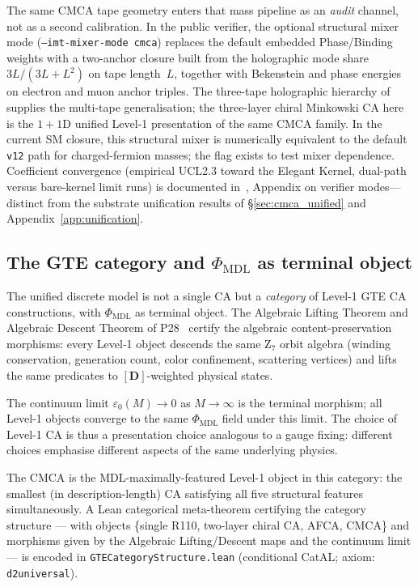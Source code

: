 \documentclass[11pt]{article}
\theoremstyle{remark}
\newcommand{\PHIMDL}{\Phi_{\mathrm{MDL}}}
\newcommand{\lean}[1]{%
  \penalty-100
  \begingroup\def\_{\textunderscore\allowbreak}\texttt{#1}\endgroup}
\newcommand{\epsz}{\varepsilon_0}
\begin{document}
The same CMCA tape geometry enters that mass pipeline as an \emph{audit} channel,
not as a second calibration.
In the public verifier, the optional structural mixer mode
(\texttt{--imt-mixer-mode cmca}) replaces the default embedded Phase/Binding
weights with a two-anchor closure built from the holographic mode share
$3L/(3L+L^2)$ on tape length~$L$, together with Bekenstein and phase energies
on electron and muon anchor triples.
The three-tape holographic hierarchy of~\cite{SpivackThreeTapeCMCA} supplies the
multi-tape generalisation; the three-layer chiral Minkowski CA here is the
$1{+}1$D unified Level-1 presentation of the same CMCA family.
In the current SM closure, this structural mixer is numerically equivalent to the
default \texttt{v12} path for charged-fermion masses; the flag exists to test
mixer dependence.
Coefficient convergence (empirical UCL2.3 toward the Elegant Kernel,
dual-path versus bare-kernel limit runs) is documented in~\cite{SpivackSM},
Appendix on verifier modes---distinct from the substrate unification results
of \S\ref{sec:cmca_unified} and Appendix~\ref{app:unification}.

\subsection{The GTE category and \texorpdfstring{$\PHIMDL$}{Phi\_MDL} as terminal object}
\label{ssec:gte_category}

The unified discrete model is not a single CA but a \emph{category} of Level-1
GTE CA constructions,
with $\PHIMDL$ as terminal object.  The Algebraic Lifting Theorem and Algebraic
Descent Theorem of P28~\cite{SpivackCompUniversality} certify the algebraic
content-preservation morphisms: every Level-1 object descends the same
Z$_7$ orbit algebra (winding conservation, generation count, color confinement,
scattering vertices) and lifts the same predicates to $[\mathbf{D}]$-weighted
physical states.

The continuum limit $\epsz(M)\to0$ as $M\to\infty$ is the terminal morphism;
all Level-1 objects converge to the same $\PHIMDL$ field under this limit.
The choice of Level-1 CA is thus a presentation choice analogous to a gauge
fixing: different choices emphasise different aspects of the same underlying
physics.

The CMCA is the MDL-maximally-featured Level-1 object in this category:
the smallest (in description-length) CA satisfying all five structural features
simultaneously.  A Lean categorical meta-theorem certifying the category structure
--- with objects \{single R110, two-layer chiral CA, AFCA, CMCA\} and morphisms
given by the Algebraic Lifting/Descent maps and the continuum limit --- is
encoded in \lean{GTECategoryStructure.lean} (conditional CatAL; axiom:
\lean{d2\_universal}).
\end{document}
